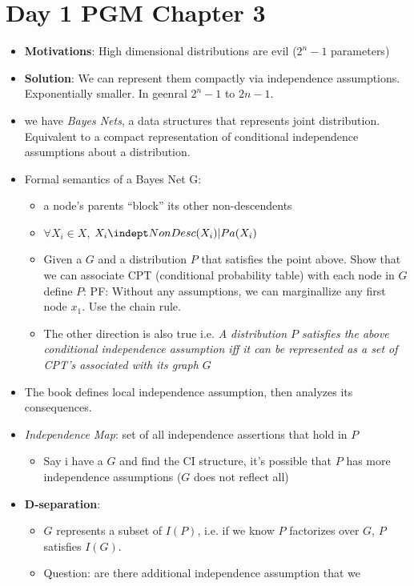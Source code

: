 \section{Day 1 PGM Chapter 3}
\begin{itemize}
\item \textbf{Motivations}: High dimensional distributions are evil ($2^n
-1$ parameters)
\item \textbf{Solution}: We can represent them compactly via independence
assumptions. Exponentially smaller. In geenral $2^n - 1$ to $2n-1$.
\item we have \emph{Bayes Nets}, a data structures that represents
  joint distribution. Equivalent to a compact representation of
  conditional independence assumptions about a distribution.
\item Formal semantics of a Bayes Net G:
  \begin{itemize}
  \item a node's parents ``block'' its other non-descendents
  \item $\forall X_i \in X$, $X_i \indept NonDesc(X_i) | Pa(X_i)$
  \item Given a $G$ and a distribution $P$ that satisfies
    the point above. Show that we can
    associate CPT (conditional probability table) with each node in
    $G$  define $P$:
PF: Without any assumptions, we can marginallize any first node
$x_1$. Use the chain rule.
  \item The other direction is also true i.e. \emph{A distribution $P$
    satisfies the above conditional independence assumption iff it can
  be represented as a set of CPT's associated with its graph $G$}
  \end{itemize}
\item The book defines local independence assumption, then analyzes
  its consequences.
\item \emph{Independence Map}: set of all independence assertions that hold
  in $P$
  \begin{itemize}
  \item Say i have a $G$ and find the CI structure, it's possible that
    $P$ has more independence assumptions ($G$ does not reflect all)
  \end{itemize}
\item \textbf{D-separation}:
  \begin{itemize}
  \item $G$ represents a subset of $I(P)$, i.e. if we know $P$ factorizes
    over $G$, $P$ satisfies $I(G)$.
  \item Question: are there additional independence assumption that we

\end{itemize}
\end{itemize}
